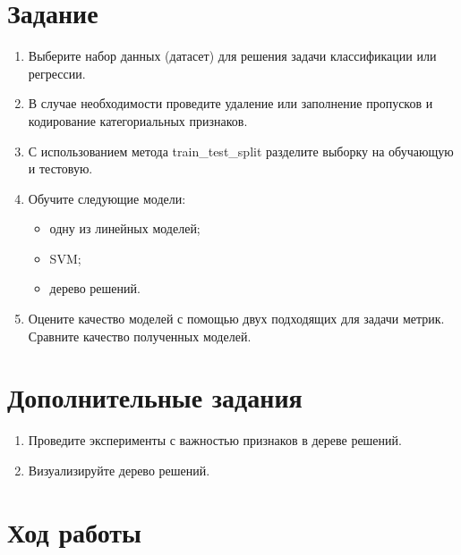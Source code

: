 \documentclass[a4paper]{article}
\begin{document}
  \section*{Задание}
  \begin{enumerate}
    \item Выберите набор данных (датасет) для решения задачи классификации или регрессии.
    \item В случае необходимости проведите удаление или заполнение пропусков и кодирование категориальных признаков.
    \item С использованием метода train\_test\_split разделите выборку на обучающую и тестовую.
    \item Обучите следующие модели:
      \begin{itemize}
        \item одну из линейных моделей;
        \item SVM;
        \item дерево решений.
      \end{itemize}
    \item
      Оцените качество моделей с помощью двух подходящих для задачи метрик.
      Сравните качество полученных моделей.
  \end{enumerate}
  \section*{Дополнительные задания}
  \begin{enumerate}
    \item Проведите эксперименты с важностью признаков в дереве решений.
    \item Визуализируйте дерево решений.
  \end{enumerate}

  \section*{Ход работы}
  \clearpage
  
\end{document}
